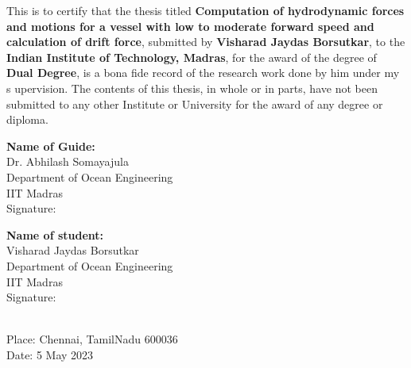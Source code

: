 \certificate


This is to certify that the thesis titled {\bf  Computation of hydrodynamic forces and motions 
for a vessel with low to moderate forward speed and calculation of drift force}, 
submitted by {\bf Visharad Jaydas Borsutkar}, to the
 {\bf Indian Institute of Technology, Madras}, for the award of the degree of 
 {\bf Dual Degree}, is a bona fide record of the research work done by him under my s
 upervision. The contents of this thesis, in whole or in parts, have not been submitted 
 to any other Institute or University for the award of any degree or diploma.
\\[2.5cm]


\begin{minipage}[t]{0.50\textwidth}
    \textbf{Name of Guide:} \\
    Dr. Abhilash Somayajula\\
    Department of Ocean Engineering\\
    IIT Madras\\

    \vspace{1em}
    Signature:

\end{minipage}%
\hspace{1cm}
\begin{minipage}[t]{0.45\textwidth}
    \textbf{Name of student:} \\
    Visharad Jaydas Borsutkar \\
    Department of Ocean Engineering\\
    IIT Madras\\

    \vspace{1em}
    Signature:
\end{minipage}
\\[2cm]

\noindent Place: Chennai, TamilNadu 600036\\
Date: 5 May 2023  
